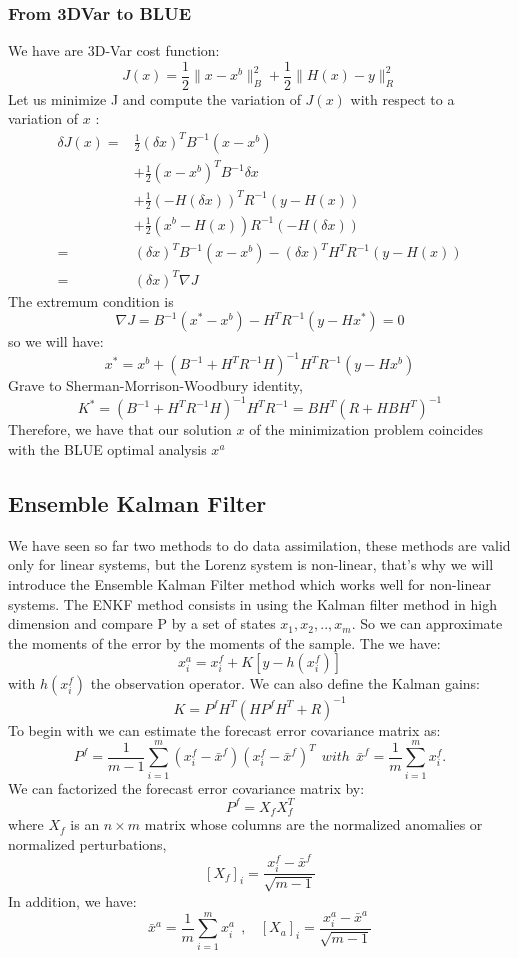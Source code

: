 \subsubsection{From 3DVar to BLUE}
\noindent We have are 3D-Var cost function:
$$J(x)=\frac{1}{2}\|x-x^b\|_B^2+\frac{1}{2}\|H(x)-y\|_{R}^2 $$
 Let us minimize J and compute the variation of $J(x)$ with respect to
a variation of $x$ :
$$\begin{aligned}
\delta J(x)=&\frac{1}{2}(\delta x)^TB^{-1}(x-x^b) \\
&+\frac{1}{2}(x-x^b)^TB^{-1}\delta x \\ &+\frac{1}{2}(-H(\delta x))^TR^{-1}(y-H(x)) \\
&+\frac{1}{2}(x^b-H(x))R^{-1}(-H(\delta x)) \\
=&(\delta x)^TB^{-1}(x-x^b)-(\delta x)^TH^TR^{-1}(y-H(x)) \\
=&(\delta x)^T \nabla J
\end{aligned}$$
The extremum condition is 
$$\nabla J=B^{-1}(x^*-x^b)-H^TR^{-1}(y-Hx^*)=0$$
so we will have:
$$x^*=x^b+(B^{-1}+H^TR^{-1}H)^{-1}H^TR^{-1}(y-Hx^b)$$
Grave to Sherman-Morrison-Woodbury identity,
$$K^*=(B^{-1}+H^TR^{-1}H)^{-1}H^TR^{-1}=BH^T(R+HBH^T)^{-1}$$
Therefore, we have that our solution $x$ of the minimization problem coincides with the BLUE optimal analysis $x^a$
\subsection{Ensemble Kalman Filter}
\noindent We have seen so far two methods to do data assimilation, these methods are valid only for linear systems, but the Lorenz system is non-linear, that's why we will introduce the Ensemble Kalman Filter method which works well for non-linear systems. The ENKF method consists in using the Kalman filter method in high dimension and compare P by a set of states $x_1,x_2,..,x_{m}$. So we can approximate the moments of the error by the moments of the sample.
The we have:
$$x_i^a=x_i^f+K[y-h(x_i^f)]$$
with $h(x_i^f)$ the observation operator.
We can also define the Kalman gains: 
$$K=P^f H^T(HP^f H^T+R)^{-1}$$
To begin with we can estimate the
forecast error covariance matrix as:
$$P^f=\frac{1}{m-1}\sum_{i=1}^{m}(x_i^f-\bar{x}^f)(x_i^f-\bar{x}^f)^T~~with~~\bar{x}^f=\frac{1}{m}\sum_{i=1}^{m}x_i^f .$$ 
\noindent We can factorized the forecast error covariance matrix by:
$$P^f=X_f X_f^T$$
where $X_f$ is an $n \times m$ matrix whose columns are the normalized anomalies or normalized perturbations,
$$[X_f]_i=\frac{x_i^f-\bar{x}^f}{\sqrt{m-1}}$$
In addition, we have:
$$
\bar{x}^a=\frac{1}{m}\sum_{i=1}^mx_i^a~~,~~~~[X_a]_i=\frac{x_i^a-\bar{x}^a}{\sqrt{m-1}} $$
